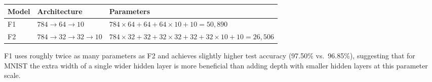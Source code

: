 \documentclass{article}
\begin{document}
\begin{center}
\begin{tabular}{lll}
\toprule
Model & Architecture & Parameters \\
\midrule
F1 & $784\!\to\!64\!\to\!10$ & $784\times64+64+64\times10+10 = 50{,}890$ \\
F2 & $784\!\to\!32\!\to\!32\!\to\!10$ & $784\times32+32+32\times32+32+32\times10+10 = 26{,}506$ \\
\bottomrule
\end{tabular}
\end{center}

F1 uses roughly twice as many parameters as F2 and achieves slightly higher test
accuracy (97.50\% vs.\ 96.85\%), suggesting that for MNIST the extra width of a
single wider hidden layer is more beneficial than adding depth with smaller hidden
layers at this parameter scale.

\clearpage
\end{document}
